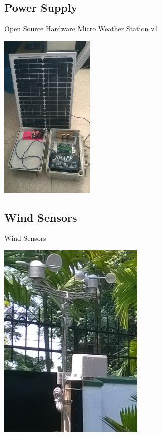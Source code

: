 \documentclass[xcolor=dvipsnames,beamer]{beamer} %
\begin{document}
\subsection{Power Supply}
\begin{frame}[fragile]{Open Source Hardware Micro Weather Station v1}

\begin{center}
\includegraphics[width=4.5cm]{MWSv1_power}
\end{center}
\end{frame}

\subsection{Wind Sensors}
\begin{frame}[fragile]{Wind Sensors}

\begin{center}
 \includegraphics[width=7cm]{MWSv1_sensors}
\end{center}

\end{frame}
\end{document}
